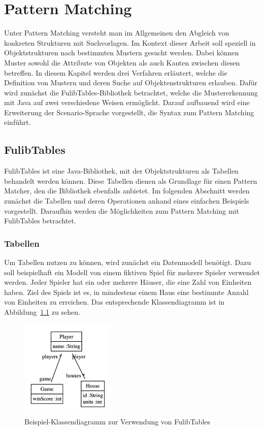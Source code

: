 \chapter{Pattern Matching}\label{ch:pattern-matching}

Unter Pattern Matching versteht man im Allgemeinen den Abgleich von konkreten Strukturen mit Suchvorlagen.
Im Kontext dieser Arbeit soll speziell in Objektstrukturen nach bestimmten Mustern gesucht werden.
Dabei können Muster sowohl die Attribute von Objekten als auch Kanten zwischen diesen betreffen.
In diesem Kapitel werden drei Verfahren erläutert, welche die Definition von Mustern und deren Suche auf Objektenstrukturen erlauben.
Dafür wird zunächst die FulibTables\cite{fulibTables}-Bibliothek betrachtet, welche die Mustererkennung mit Java auf zwei verschiedene Weisen ermöglicht.
Darauf aufbauend wird eine Erweiterung der Scenario-Sprache vorgestellt, die Syntax zum Pattern Matching einführt.

\section{FulibTables}\label{sec:fulib-tables}

FulibTables ist eine Java-Bibliothek, mit der Objektstrukturen als Tabellen behandelt werden können.
Diese Tabellen dienen als Grundlage für einen Pattern Matcher, den die Bibliothek ebenfalls anbietet.
Im folgenden Abschnitt werden zunächst die Tabellen und deren Operationen anhand eines einfachen Beispiels vorgestellt.
Daraufhin werden die Möglichkeiten zum Pattern Matching mit FulibTables betrachtet.

\subsection{Tabellen}\label{subsec:tables}

Um Tabellen nutzen zu können, wird zunächst ein Datenmodell benötigt.
Dazu soll beispielhaft ein Modell von einem fiktiven Spiel für mehrere Spieler verwendet werden.
Jeder Spieler hat ein oder mehrere Häuser, die eine Zahl von Einheiten haben.
Ziel des Spiels ist es, in mindestens einem Haus eine bestimmte Anzahl von Einheiten zu erreichen.
Das entsprechende Klassendiagramm ist in Abbildung~\ref{fig:game-class-diagram} zu sehen.

\begin{figure}
    \centering
    \includegraphics[width=0.4\textwidth]{chapter/pattern-matching/img/game-class-diagram.png}
    \caption{Beispiel-Klassendiagramm zur Verwendung von FulibTables}
    \label{fig:game-class-diagram}
\end{figure}

